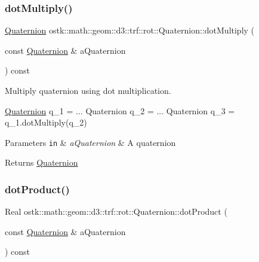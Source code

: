 \subsubsection{\texorpdfstring{dot\+Multiply()}{dotMultiply()}}
{\footnotesize\ttfamily \hyperlink{classostk_1_1math_1_1geom_1_1d3_1_1trf_1_1rot_1_1_quaternion}{Quaternion} ostk\+::math\+::geom\+::d3\+::trf\+::rot\+::\+Quaternion\+::dot\+Multiply (\begin{DoxyParamCaption}\item[{const \hyperlink{classostk_1_1math_1_1geom_1_1d3_1_1trf_1_1rot_1_1_quaternion}{Quaternion} \&}]{a\+Quaternion }\end{DoxyParamCaption}) const}



Multiply quaternion using dot multiplication. 


\begin{DoxyCode}
\hyperlink{classostk_1_1math_1_1geom_1_1d3_1_1trf_1_1rot_1_1_quaternion_ad9fd7d8eb5effb4d4e0394bbb5bb86dc}{Quaternion} q\_1 = ...
Quaternion q\_2 = ...
Quaternion q\_3 = q\_1.dotMultiply(q\_2)
\end{DoxyCode}



\begin{DoxyParams}[1]{Parameters}
\mbox{\tt in}  & {\em a\+Quaternion} & A quaternion \\
\hline
\end{DoxyParams}
\begin{DoxyReturn}{Returns}
\hyperlink{classostk_1_1math_1_1geom_1_1d3_1_1trf_1_1rot_1_1_quaternion}{Quaternion} 
\end{DoxyReturn}
\mbox{\label{classostk_1_1math_1_1geom_1_1d3_1_1trf_1_1rot_1_1_quaternion_aa7b7f1ecf3f95348af7b5f5dc5099ad5}} 
\subsubsection{\texorpdfstring{dot\+Product()}{dotProduct()}}
{\footnotesize\ttfamily Real ostk\+::math\+::geom\+::d3\+::trf\+::rot\+::\+Quaternion\+::dot\+Product (\begin{DoxyParamCaption}\item[{const \hyperlink{classostk_1_1math_1_1geom_1_1d3_1_1trf_1_1rot_1_1_quaternion}{Quaternion} \&}]{a\+Quaternion }\end{DoxyParamCaption}) const}



